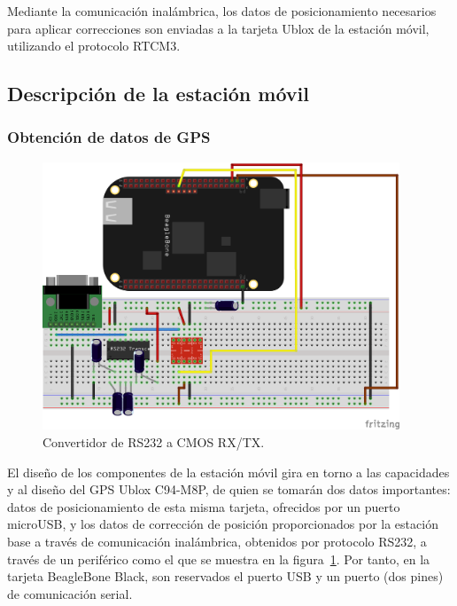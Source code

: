 Mediante la comunicación inalámbrica, los datos de posicionamiento necesarios para aplicar correcciones son enviadas a la tarjeta Ublox de la estación móvil, utilizando el protocolo RTCM3.

\subsection{Descripción de la estación móvil}

\subsubsection{Obtención de datos de GPS}

\begin{figure}[H]
\centering
\includegraphics[width=0.95\textwidth]{Figures/Max232}
\caption[Convertidor de RS232 a CMOS RX/TX.]{Convertidor de RS232 a CMOS RX/TX.\footnotemark}
\label{fig:convert}
\end{figure}


El diseño de los componentes de la estación móvil gira en torno a las capacidades y al diseño del GPS Ublox C94-M8P, de quien se tomarán dos datos importantes: datos de posicionamiento de esta misma tarjeta, ofrecidos por un puerto microUSB, y los datos de corrección de posición proporcionados por la estación base a través de comunicación inalámbrica, obtenidos por protocolo RS232, a través de un periférico como el que se muestra en la figura~\ref{fig:convert}. Por tanto, en la tarjeta BeagleBone Black, son reservados el puerto USB y un puerto (dos pines) de comunicación serial.\\

